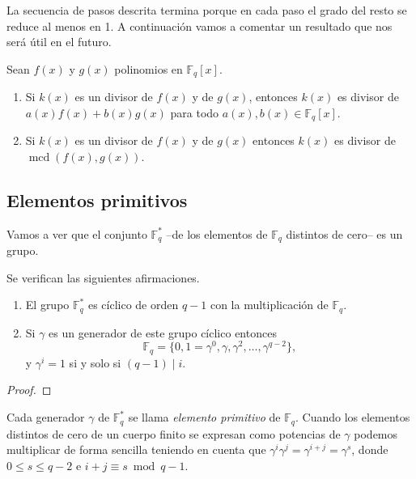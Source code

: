 La secuencia de pasos descrita termina porque en cada paso el grado del resto se reduce al menos en 1.
A continuación vamos a comentar un resultado que nos será útil en el futuro.

\begin{proposition}
  Sean \(f(x)\) y \(g(x)\) polinomios en \(\mathbb F_q[x]\).
  \begin{enumerate}
    \item Si \(k(x)\) es un divisor de \(f(x)\) y de \(g(x)\), entonces \(k(x)\) es divisor de \(a(x)f(x) + b(x)g(x)\) para todo \(a(x), b(x) \in \mathbb F_q[x]\).
    \item Si \(k(x)\) es un divisor de \(f(x)\) y de \(g(x)\) entonces \(k(x)\) es divisor de \(\operatorname{mcd}(f(x), g(x))\).
  \end{enumerate}
\end{proposition}


\subsection{Elementos primitivos}

Vamos a ver que el conjunto \(\mathbb F_q^*\) --de los elementos de \(\mathbb F_q\) distintos de cero-- es un grupo.

\begin{theorem}
  \label{th:Fq-ast-cilcico}
  Se verifican las siguientes afirmaciones.
  \begin{enumerate}
    \item El grupo \(\mathbb F_q^*\) es cíclico de orden \(q - 1\) con la multiplicación de \(\mathbb F_q\).
    \item Si \(\gamma\) es un generador de este grupo cíclico entonces
    \[
      \mathbb F_q = \{0, 1 = \gamma^0, \gamma, \gamma^2, \dots, \gamma^{q-2}\},
    \] y \(\gamma^i = 1\) si y solo si \((q-1) \mid i\).
  \end{enumerate}
\end{theorem}

\begin{proof}
\end{proof}

Cada generador \(\gamma\) de \(\mathbb F_q^*\) se llama \textit{elemento primitivo} de \(\mathbb F_q\).
Cuando los elementos distintos de cero de un cuerpo finito se expresan como potencias de \(\gamma\) podemos multiplicar de forma sencilla teniendo en cuenta que \(\gamma^i\gamma^j = \gamma^{i+j} = \gamma^s\), donde \(0 \leq s \leq q-2\) e \(i + j \equiv s \bmod q - 1\).

